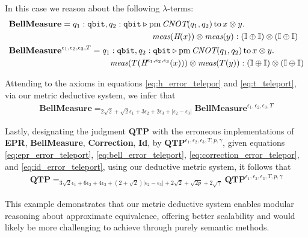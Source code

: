     In this case we reason about the following $\lambda$-terms:
    \begin{align*}
      &\textbf{BellMeasure} =  q_{1}: \mathtt{qbit}, q_{2}: \mathtt{qbit}
   \vljud  \text{pm} \, \textit{CNOT} (q_{1},q_{2})
  \,  \text{to}\, x \otimes y. \,
    \\ 
   & \hspace{170pt} \textit{meas} (\textit{H} (x)) \otimes \textit{meas} (y) : \left(\typeI\oplus \typeI\right) \otimes \left(\typeI\oplus
   \typeI\right) \\
      & \textbf{BellMeasure}^{\epsilon_1, \epsilon_2,\epsilon_3,T} =  q_{1}: \mathtt{qbit}, q_{2}: \mathtt{qbit}
      \vljud  \text{pm} \, \textit{CNOT} (q_{1},q_{2})
     \,  \text{to}\, x \otimes y. \,
     \\
      &  \hspace{120pt} \textit{meas} (T(\textit{H}^{\epsilon_1, \epsilon_2,\epsilon_3} (x))) \otimes \textit{meas} ( T(y)):\left(\typeI\oplus \typeI\right) \otimes \left(\typeI\oplus
      \typeI\right) \\
    \end{align*}
  
  Attending to the axioms in equations \eqref{eq:h_error_telepor} and \eqref{eq:t_teleport}, via our metric deductive system, we infer that
  \begin{align} \label{eq:bell_error_teleport}
    \textbf{BellMeasure} =_{2 \sqrt{2} + \sqrt{2}\epsilon_1 + 3\epsilon_2 + 2\epsilon_3 + |\epsilon_2-\epsilon_3|} \textbf{BellMeasure}^{\epsilon_1, \epsilon_2,\epsilon_3,T}
  \end{align}

  Lastly, designating the judgment \textbf{QTP} with the erroneous implementations of \textbf{EPR}, \textbf{BellMeasure}, \textbf{Correction}, \textbf{Id}, by $\textbf{QTP}^{\epsilon_1, \epsilon_2,\epsilon_3,T,p,\gamma}$, given equations \eqref{eq:epr_error_teleport}, \eqref{eq:bell_error_teleport}, \eqref{eq:correction_error_telepor}, and  \eqref{eq:id_error_teleport}, using our deductive metric system, it follows that
  \begin{align*}
    \textbf{QTP} =_{ 3\sqrt{2}\epsilon_1 + 6\epsilon_2 + 4\epsilon_3 + (2+\sqrt{2})|\epsilon_2-\epsilon_3| + 2 \sqrt{2} + \sqrt{2p}  +2\sqrt{\gamma}} \textbf{QTP}^{\epsilon_1, \epsilon_2,\epsilon_3,T,p,\gamma}
  \end{align*}

This example demonstrates that our metric deductive system enables modular reasoning about approximate equivalence, offering better scalability and would likely be more challenging to achieve through purely semantic methods.

